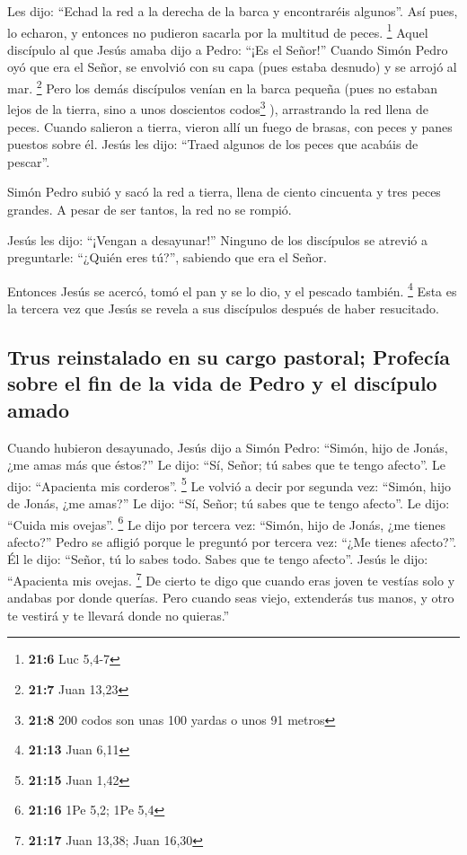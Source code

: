 \begin{paracol}{2}
 Les dijo: ``Echad la red a la derecha de la barca y
encontraréis algunos''. Así pues, lo echaron, y entonces no pudieron
sacarla por la multitud de peces. \footnote{\textbf{21:6} Luc 5,4-7}
 Aquel discípulo al que Jesús amaba dijo a Pedro: ``¡Es el
Señor!'' Cuando Simón Pedro oyó que era el Señor, se envolvió con su
capa (pues estaba desnudo) y se arrojó al mar. \footnote{\textbf{21:7}
  Juan 13,23}  Pero los demás discípulos venían en la
barca pequeña (pues no estaban lejos de la tierra, sino a unos
doscientos codos\footnote{\textbf{21:8} 200 codos son unas 100 yardas o
  unos 91 metros} ), arrastrando la red llena de peces. 
Cuando salieron a tierra, vieron allí un fuego de brasas, con peces y
panes puestos sobre él.  Jesús les dijo: ``Traed algunos
de los peces que acabáis de pescar''.

 Simón Pedro subió y sacó la red a tierra, llena de
ciento cincuenta y tres peces grandes. A pesar de ser tantos, la red no
se rompió.

 Jesús les dijo: ``¡Vengan a desayunar!'' Ninguno de los
discípulos se atrevió a preguntarle: ``¿Quién eres tú?'', sabiendo que
era el Señor.

 Entonces Jesús se acercó, tomó el pan y se lo dio, y el
pescado también. \footnote{\textbf{21:13} Juan 6,11} 
Esta es la tercera vez que Jesús se revela a sus discípulos después de
haber resucitado.

\hypertarget{trus-reinstalado-en-su-cargo-pastoral-profecuxeda-sobre-el-fin-de-la-vida-de-pedro-y-el-discuxedpulo-amado}{%
\subsection{Trus reinstalado en su cargo pastoral; Profecía sobre el fin
de la vida de Pedro y el discípulo
amado}\label{trus-reinstalado-en-su-cargo-pastoral-profecuxeda-sobre-el-fin-de-la-vida-de-pedro-y-el-discuxedpulo-amado}}

 Cuando hubieron desayunado, Jesús dijo a Simón Pedro:
``Simón, hijo de Jonás, ¿me amas más que éstos?'' Le dijo: ``Sí, Señor;
tú sabes que te tengo afecto''. Le dijo: ``Apacienta mis corderos''.
\footnote{\textbf{21:15} Juan 1,42}  Le volvió a decir
por segunda vez: ``Simón, hijo de Jonás, ¿me amas?'' Le dijo: ``Sí,
Señor; tú sabes que te tengo afecto''. Le dijo: ``Cuida mis ovejas''.
\footnote{\textbf{21:16} 1Pe 5,2; 1Pe 5,4}  Le dijo por
tercera vez: ``Simón, hijo de Jonás, ¿me tienes afecto?'' Pedro se
afligió porque le preguntó por tercera vez: ``¿Me tienes afecto?''. Él
le dijo: ``Señor, tú lo sabes todo. Sabes que te tengo afecto''. Jesús
le dijo: ``Apacienta mis ovejas. \footnote{\textbf{21:17} Juan 13,38;
  Juan 16,30}  De cierto te digo que cuando eras joven te
vestías solo y andabas por donde querías. Pero cuando seas viejo,
extenderás tus manos, y otro te vestirá y te llevará donde no quieras.''


\end{paracol}
